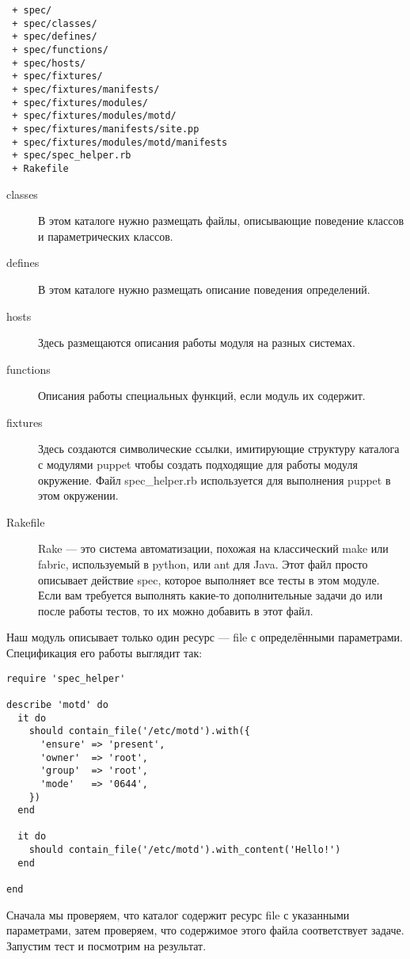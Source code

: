 \begin{verbatim}
 + spec/
 + spec/classes/
 + spec/defines/
 + spec/functions/
 + spec/hosts/
 + spec/fixtures/
 + spec/fixtures/manifests/
 + spec/fixtures/modules/
 + spec/fixtures/modules/motd/
 + spec/fixtures/manifests/site.pp
 + spec/fixtures/modules/motd/manifests
 + spec/spec_helper.rb
 + Rakefile
\end{verbatim}

\begin{description}
\item[classes] В этом каталоге нужно размещать файлы, описывающие поведение классов и параметрических классов.
\item[defines] В этом каталоге нужно размещать описание поведения определений.
\item[hosts] Здесь размещаются описания работы модуля на разных системах.
\item[functions] Описания работы специальных функций, если модуль их содержит.
\item[fixtures] Здесь создаются символические ссылки, имитирующие структуру каталога с модулями puppet чтобы создать подходящие для работы модуля окружение. Файл spec\_helper.rb используется для выполнения puppet в этом окружении.
\item[Rakefile] Rake --- это система автоматизации, похожая на классический make или fabric, используемый в python, или ant для Java. Этот файл просто описывает действие spec, которое выполняет все тесты в этом модуле. Если вам требуется выполнять какие-то дополнительные задачи до или после работы тестов, то их можно добавить в этот файл.
\end{description}

Наш модуль описывает только один ресурс --- file с определёнными параметрами. Спецификация его работы выглядит так:

\begin{verbatim}
require 'spec_helper'

describe 'motd' do
  it do
    should contain_file('/etc/motd').with({
      'ensure' => 'present',
      'owner'  => 'root',
      'group'  => 'root',
      'mode'   => '0644',
    })
  end

  it do
    should contain_file('/etc/motd').with_content('Hello!')
  end

end
\end{verbatim}

Сначала мы проверяем, что каталог содержит ресурс file с указанными параметрами, затем проверяем, что содержимое этого файла соответствует задаче. Запустим тест и посмотрим на результат.

